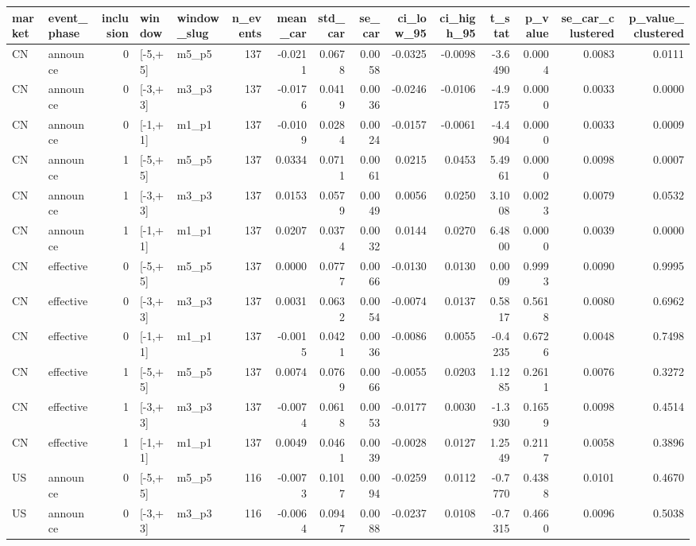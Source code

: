 \begin{tabular}{llrllrrrrrrrrrr}
\toprule
market & event_phase & inclusion & window & window_slug & n_events & mean_car & std_car & se_car & ci_low_95 & ci_high_95 & t_stat & p_value & se_car_clustered & p_value_clustered \\
\midrule
CN & announce & 0 & [-5,+5] & m5_p5 & 137 & -0.0211 & 0.0678 & 0.0058 & -0.0325 & -0.0098 & -3.6490 & 0.0004 & 0.0083 & 0.0111 \\
CN & announce & 0 & [-3,+3] & m3_p3 & 137 & -0.0176 & 0.0419 & 0.0036 & -0.0246 & -0.0106 & -4.9175 & 0.0000 & 0.0033 & 0.0000 \\
CN & announce & 0 & [-1,+1] & m1_p1 & 137 & -0.0109 & 0.0284 & 0.0024 & -0.0157 & -0.0061 & -4.4904 & 0.0000 & 0.0033 & 0.0009 \\
CN & announce & 1 & [-5,+5] & m5_p5 & 137 & 0.0334 & 0.0711 & 0.0061 & 0.0215 & 0.0453 & 5.4961 & 0.0000 & 0.0098 & 0.0007 \\
CN & announce & 1 & [-3,+3] & m3_p3 & 137 & 0.0153 & 0.0579 & 0.0049 & 0.0056 & 0.0250 & 3.1008 & 0.0023 & 0.0079 & 0.0532 \\
CN & announce & 1 & [-1,+1] & m1_p1 & 137 & 0.0207 & 0.0374 & 0.0032 & 0.0144 & 0.0270 & 6.4800 & 0.0000 & 0.0039 & 0.0000 \\
CN & effective & 0 & [-5,+5] & m5_p5 & 137 & 0.0000 & 0.0777 & 0.0066 & -0.0130 & 0.0130 & 0.0009 & 0.9993 & 0.0090 & 0.9995 \\
CN & effective & 0 & [-3,+3] & m3_p3 & 137 & 0.0031 & 0.0632 & 0.0054 & -0.0074 & 0.0137 & 0.5817 & 0.5618 & 0.0080 & 0.6962 \\
CN & effective & 0 & [-1,+1] & m1_p1 & 137 & -0.0015 & 0.0421 & 0.0036 & -0.0086 & 0.0055 & -0.4235 & 0.6726 & 0.0048 & 0.7498 \\
CN & effective & 1 & [-5,+5] & m5_p5 & 137 & 0.0074 & 0.0769 & 0.0066 & -0.0055 & 0.0203 & 1.1285 & 0.2611 & 0.0076 & 0.3272 \\
CN & effective & 1 & [-3,+3] & m3_p3 & 137 & -0.0074 & 0.0618 & 0.0053 & -0.0177 & 0.0030 & -1.3930 & 0.1659 & 0.0098 & 0.4514 \\
CN & effective & 1 & [-1,+1] & m1_p1 & 137 & 0.0049 & 0.0461 & 0.0039 & -0.0028 & 0.0127 & 1.2549 & 0.2117 & 0.0058 & 0.3896 \\
US & announce & 0 & [-5,+5] & m5_p5 & 116 & -0.0073 & 0.1017 & 0.0094 & -0.0259 & 0.0112 & -0.7770 & 0.4388 & 0.0101 & 0.4670 \\
US & announce & 0 & [-3,+3] & m3_p3 & 116 & -0.0064 & 0.0947 & 0.0088 & -0.0237 & 0.0108 & -0.7315 & 0.4660 & 0.0096 & 0.5038 \\

\end{tabular}

